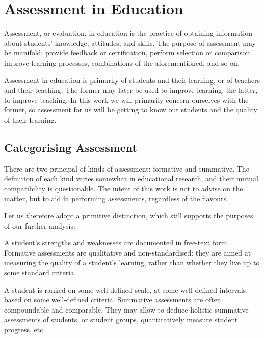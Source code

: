 
\section{Assessment in Education}


Assessment, or evaluation, in education is the practice of obtaining
information about students' knowledge, attitudes, and
skills\cite{assessment-and-burnout}.  The purpose of assessment may be
manifold: provide feedback or certification, perform selection or comparison,
improve learning processes, combinations of the aforementioned, and so
on\cite{first-ten-years}.

Assessment in education is primarily of students and their learning, or of
teachers and their teaching. The former may later be used to improve learning,
the latter, to improve teaching. In this work we will primarily concern
ourselves with the former, so assessment for us will be getting to know our
students and the quality of their learning\cite{ramsden1992}.

\subsection{Categorising Assessment}

There are two principal of kinds of assessment: formative and summative. The
definition of each kind varies somewhat in educational research\cite{bloom1971,
sadler1989, formative-vs-summative}, and their mutual compatibility is
questionable\cite{butler1988}. The intent of this work is not to advise on the
matter, but to aid in performing assessments, regardless of the flavours.

Let us therefore adopt a primitive distinction, which still supports the
purposes of our further analysis:

\begin{description}[\setleftmargin{60pt}\setlabelstyle{\bf}]

\item[Formative] A student's strengths and weaknesses are documented in
free-text form. Formative assessments are qualitative and non-standard\-ised:
they are aimed at measuring the quality of a student's learning, rather than
whether they live up to some standard criteria. 

\item[Summative] A student is ranked on some well-defined scale, at some
well-defined intervals, based on some well-defined criteria. Summative
assessments are often compoundable and comparable. They may allow to deduce
holistic summative assessments of students, or student groups, quantitatively
measure student progress, etc.

\end{description}

